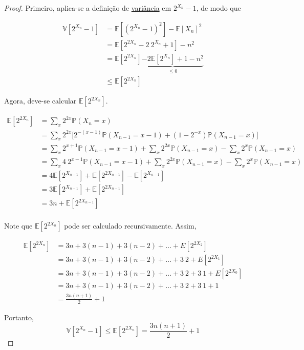 \begin{proof}
Primeiro, aplica-se a definição de \hyperref[ap:variance]{variância} em $2^{X_n} - 1$, de modo que

\begin{align*}
  \mathbb{V}[2^{X_n} - 1] 
    &= \mathbb{E}[(2^{X_n} - 1) ^ 2] - \mathbb{E}[X_n]^2  \\
    &= \mathbb{E}[2^{2X_n} -2 \ 2^{X_n} + 1] - n^2 \\
    &= \mathbb{E}[2^{2X_n}] \underbrace{-2 \mathbb{E} [2^{X_n}] + 1 - n^2}_{\leq 0} \\ 
    &\leq \mathbb{E}[2^{2X_n}]
\end{align*}

Agora, deve-se calcular $\mathbb{E}[2^{2X_n}]$.

\begin{align*}
  \mathbb{E}[2^{2X_n}]  
    &=  \sum_{x} 2^{2x} \mathbb{P}(X_n = x) \\
    &=  \sum_{x} 2^{2x} \Big[ 2^{-(x-1)} \mathbb{P}(X_{n-1} = x-1) + (1 - 2^{-x}) \mathbb{P}(X_{n-1} = x) \Big] \\
    &=  \sum_{x} 2^{x+1} \mathbb{P}(X_{n-1} = x-1) + \sum_{x} 2^{2x} \mathbb{P}(X_{n-1} = x) - \sum_{x} 2^{x} \mathbb{P}(X_{n-1} = x) \\
    &=  \sum_{x} 4 \ 2^{x-1} \mathbb{P}(X_{n-1} = x-1) + \sum_{x} 2^{2x} \mathbb{P}(X_{n-1} = x) - \sum_{x} 2^{x} \mathbb{P}(X_{n-1} = x)  \\
    &=  4 \mathbb{E}[2^{X_{n-1}}] + \mathbb{E}[2^{2X_{n-1}}] - \mathbb{E}[2^{X_{n-1}}]  \\
    &=  3 \mathbb{E}[2^{X_{n-1}}] + \mathbb{E}[2^{2X_{n-1}}]  \\
    &=  3 n + \mathbb{E}[2^{2X_{n-1}}]  \\
\end{align*}

Note que $\mathbb{E}[2^{2X_n}]$ pode ser calculado recursivamente. Assim,

\begin{align*}
  \mathbb{E}[2^{2X_{n}}] 
    &= 3n + 3(n-1) + 3(n-2) + \dots + E[2^{2X_2}] \\
    &= 3n + 3(n-1) + 3(n-2) + \dots + 3 \ 2 + E[2^{2X_1}] \\
    &= 3n + 3(n-1) + 3(n-2) + \dots + 3 \ 2 + 3 \ 1 + E[2^{2X_0}] \\
    &= 3n + 3(n-1) + 3(n-2) + \dots + 3 \ 2 + 3 \ 1 + 1 \\
    &= \frac{3n(n+1)}{2} + 1
\end{align*}

Portanto, 
\[ \mathbb{V}[2^{X_n} - 1] \leq \mathbb{E}[2^{2X_n}] = \frac{3n(n+1)}{2} + 1 \]

\end{proof}


